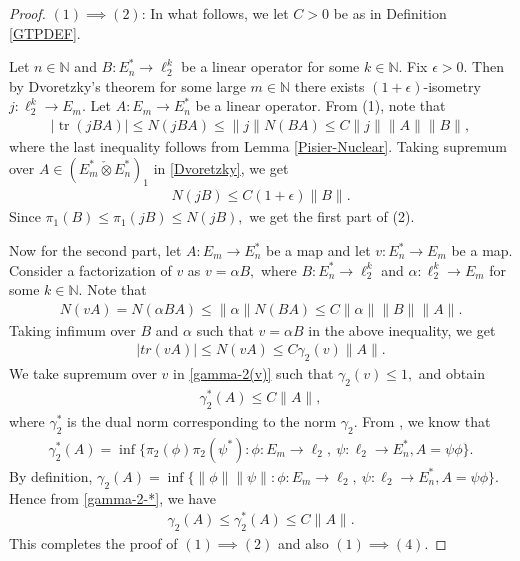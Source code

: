 \documentclass[a4paper,oneside,11pt, reqno]{amsart}
\numberwithin{equation}{section}
\theoremstyle{plain}
\begin{document}
\begin{proof}
\textbf{$(1) \implies (2)$}: In what follows, we let $C>0$ be as in Definition \ref{GTPDEF}.

 Let $n\in\mathbb N$ and $B:E_n^*\to\ell_2^k$ be a linear operator for some $k\in\mathbb{N}$. Fix $\epsilon>0.$ Then by Dvoretzky's theorem for some large $m\in\mathbb{N}$ there exists $(1+\epsilon)$-isometry $j:\ell_2^k\to E_m.$ Let $A:E_m\to E_n^*$ be a linear operator. 
From (1), note that 
\begin{eqnarray}\label{Dvoretzky}
|\operatorname{tr}(jBA)|\leqslant N(jBA) \leqslant \|j\| N(BA) \leqslant C\|j\| \|A\| \|B\|,
\end{eqnarray}
where the last inequality follows from Lemma \ref{Pisier-Nuclear}.
Taking supremum over $A\in (E_m^*\check{\otimes}E_n^*)_1$  in \eqref{Dvoretzky}, we get 
\begin{eqnarray*}
N(jB)\leqslant C(1+\epsilon) \|B\|.
\end{eqnarray*}
Since $\pi_1(B)\leqslant\pi_1(jB)\leqslant N(jB),$ we get the first part of (2). 

Now for the second part, let $A:E_m\to E_n^*$ be a map and let $v:E_n^*\to E_m$ be a map. Consider a factorization of $v$ as $v=\alpha B,$ where $B:E_n^*\to \ell_2^k$ and $\alpha:\ell_2^k\to E_m$ for some $k\in\mathbb{N}.$ Note that 
\begin{eqnarray*}
N(vA)=N(\alpha B A)\leqslant \|\alpha\| N(BA) \leqslant C \|\alpha\| \|B\| \|A\|.
\end{eqnarray*}
Taking infimum over $B$ and $\alpha$ such that $v=\alpha B$ in the above inequality, we get
\begin{eqnarray}\label{gamma-2(v)}
|tr(vA)|\leqslant N(vA) \leqslant C \gamma_2(v) \|A\|.
\end{eqnarray}
We take supremum over $v$ in \eqref{gamma-2(v)} such that $\gamma_2(v)\leqslant 1,$ and obtain  
\begin{eqnarray}\label{gamma-2-*}
\gamma_2^*(A)\leqslant C \|A\|,
\end{eqnarray}
where $\gamma_2^*$ is the dual norm corresponding to the norm $\gamma_2.$ From \cite[Proposition 2.11]{Pisier-factorization}, we know that
\begin{eqnarray}\label{gamma*}
\gamma_2^*(A)=\inf\{\pi_2(\phi)\pi_2(\psi^*):\phi:E_m\to\ell_2,\ \psi:\ell_2\to E_n^*, A=\psi\phi\}.
\end{eqnarray}
By definition, $\gamma_2(A)=\inf\{\|\phi\| \|\psi\|:\phi:E_m\to\ell_2,\ \psi:\ell_2\to E_n^*,A=\psi\phi\}.$ Hence from \eqref{gamma-2-*}, we have
\begin{eqnarray*}%
\gamma_2(A)\leqslant\gamma_2^*(A)\leqslant C\|A\|.
\end{eqnarray*}
This completes the proof of $(1) \implies (2)$ and also $(1)\implies (4).$


\end{proof}
\end{document}
